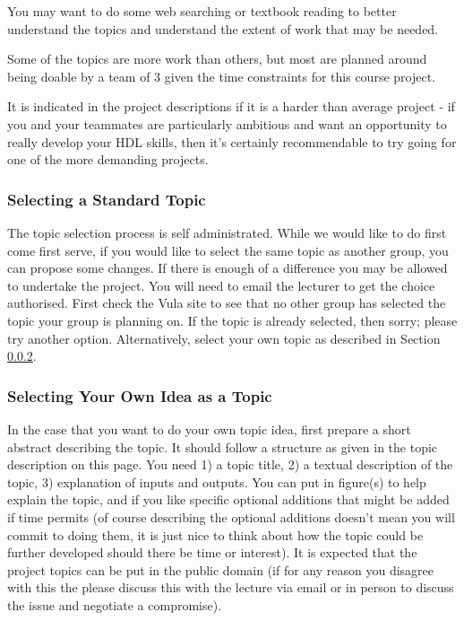 You may want to do some web searching or textbook reading to better understand the topics and understand the extent of work that may be needed.

Some of the topics are more work than others, but most are planned around being doable by a team of 3 given the time constraints for this course project.

It is indicated in the project descriptions if it is a harder than average project - if you and your teammates are particularly ambitious and want an opportunity to really develop your HDL skills, then it's certainly recommendable to try going for one of the more demanding projects.


\subsubsection{Selecting a Standard Topic}
The topic selection process is self administrated. While we would like to do first come first serve, if you would like to select the same topic as another group, you can propose some changes. If there is enough of a difference you may be allowed to undertake the project. You will need to email the lecturer to get the choice authorised. First check the Vula site to see that no other group has selected the topic your group is planning on. If the topic is already selected, then sorry; please try another option. Alternatively, select your own topic as described in Section \ref{sec:SelectOwnTopic}.

\subsubsection{Selecting Your Own Idea as a Topic}
\label{sec:SelectOwnTopic}
In the case that you want to do your own topic idea, first prepare a short abstract describing the topic. It should follow a structure as given in the topic description on this page. You need 1) a topic title, 2) a textual description of the topic, 3) explanation of inputs and outputs. You can put in figure(s) to help explain the topic, and if you like specific optional additions that might be added if time permits (of course describing the optional additions doesn't mean you will commit to doing them, it is just nice to think about how the topic could be further developed should there be time or interest). It is expected that the project topics can be put in the public domain (if for any reason you disagree with this the please discuss this with the lecture via email or in person to discuss the issue and negotiate a compromise).

